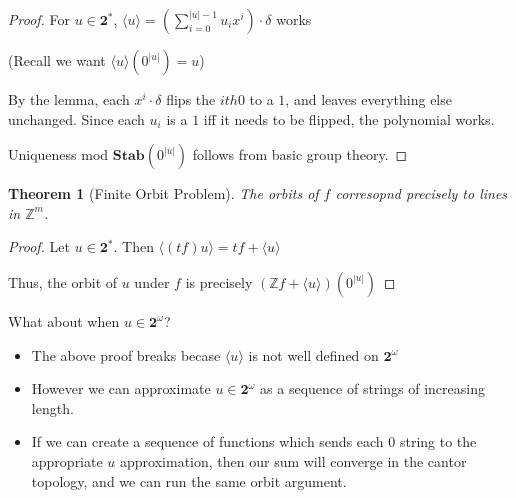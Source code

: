\documentclass{beamer}
\newtheorem{thm}{Theorem}
\newcommand{\2}{\textbf{2}}
\newcommand{\Z}{\mathbb{Z}}
\begin{document}
\begin{frame}
  \begin{proof}
    For $u \in \2^*$, $\langle u \rangle = (\sum_{i=0}^{|u|-1}u_i x^i) \cdot \delta$ works\\

    \medskip

    (Recall we want $\langle u \rangle (0^{|u|}) = u$)

    \bigskip

    By the lemma, each $x^i \cdot \delta$ flips the $ith 0$ to a $1$,
    and leaves everything else unchanged. Since each $u_i$ is a $1$ iff
    it needs to be flipped, the polynomial works.

    \bigskip

    Uniqueness mod $\textbf{Stab}(0^{|u|})$ follows from basic group theory.
  \end{proof}
\end{frame}

\begin{frame}
  \begin{thm}[Finite Orbit Problem]
    The orbits of $f$ corresopnd precisely to lines in $\Z^m$.
  \end{thm}

  \begin{proof}
    Let $u \in \2^*$. Then $\langle(tf)u\rangle = tf + \langle u \rangle$

    \bigskip

    Thus, the orbit of $u$ under $f$ is precisely 
    $(\Z f + \langle u \rangle)(0^{|u|})$
  \end{proof}
\end{frame}

\begin{frame}{What about when $u \in \2^\omega$?}
  \begin{itemize}
    \item The above proof breaks becase $\langle u \rangle$ is not well
          defined on $\2^\omega$
    \item However we can approximate $u \in \2^\omega$ as a sequence of 
          strings of increasing length.
    \item If we can create a sequence of functions which sends each $0$
          string to the appropriate $u$ approximation, then our sum will
          converge in the cantor topology, and we can run the same 
          orbit argument.
  \end{itemize}
\end{frame}
\end{document}
